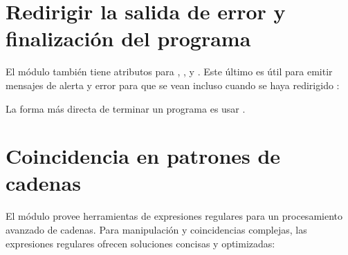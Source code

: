 \documentclass[a5paper,10pt,spanish]{sphinxmanual}
\begin{document}
\section{Redirigir la salida de error y finalización del programa}
\label{\detokenize{tutorial/stdlib:error-output-redirection-and-program-termination}}\label{\detokenize{tutorial/stdlib:tut-stderr}}
\sphinxAtStartPar
El módulo  también tiene atributos para , , y .  Este último es útil para emitir mensajes de alerta y error para que se vean incluso cuando se haya redirigido :

\begin{sphinxVerbatim}[commandchars=\\\{\}]
\end{sphinxVerbatim}

\sphinxAtStartPar
La forma más directa de terminar un programa es usar .


\section{Coincidencia en patrones de cadenas}
\label{\detokenize{tutorial/stdlib:string-pattern-matching}}\label{\detokenize{tutorial/stdlib:tut-string-pattern-matching}}
\sphinxAtStartPar
El módulo  provee herramientas de expresiones regulares para un procesamiento avanzado de cadenas.  Para manipulación y coincidencias complejas, las expresiones regulares ofrecen soluciones concisas y optimizadas:

\begin{sphinxVerbatim}[commandchars=\\\{\}]
 
 
  
\end{sphinxVerbatim}
\end{document}
